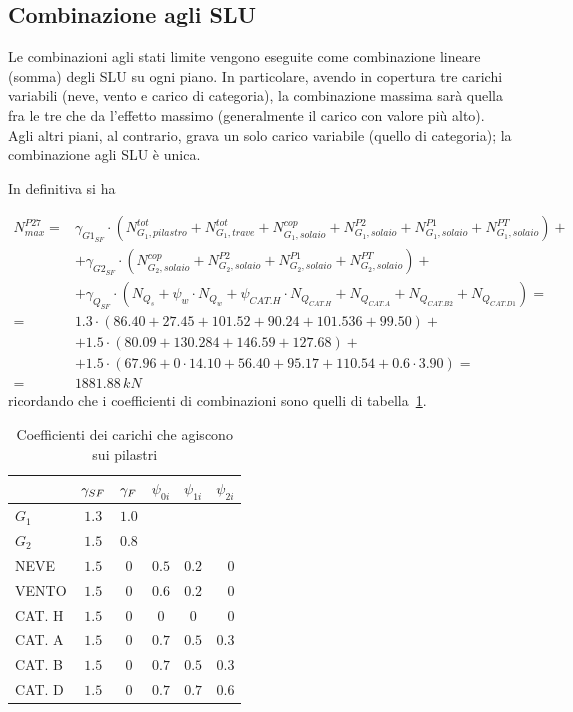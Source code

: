 \subsection{Combinazione agli SLU}
Le combinazioni agli stati limite vengono eseguite come combinazione lineare (somma) degli SLU su ogni piano. In particolare, avendo in copertura tre carichi variabili (neve, vento e carico di categoria), la combinazione massima sarà quella fra le tre che da l'effetto massimo (generalmente il carico con valore più alto). Agli altri piani, al contrario, grava un solo carico variabile (quello di categoria); la combinazione agli SLU è unica.

In definitiva si ha

\begin{align*}
	N_{max}^{P27} =& \gamma_{G1_{SF}} \cdot (N_{G_1,pilastro}^{tot} + N_{G_1, trave}^{tot} + N_{G_1, solaio}^{cop} + N_{G_1, solaio}^{P2}+ N_{G_1, solaio}^{P1} + N_{G_1, solaio}^{PT}) +\\ &+\gamma_{G2_{SF}} \cdot (N_{G_2, solaio}^{cop} + N_{G_2, solaio}^{P2}+ N_{G_2, solaio}^{P1} + N_{G_2, solaio}^{PT}) +\\
	&+\gamma_{Q_{SF}}\cdot (N_{Q_s} + \psi_{w}\cdot N_{Q_w} + \psi_{CAT.H}\cdot N_{Q_{CAT.H}} + N_{Q_{CAT.A}} + N_{Q_{CAT.B2}} + N_{Q_{CAT.D1}}) =\\
	=& 1.3\cdot(86.40+27.45+101.52+90.24+101.536+99.50)+\\
	&+1.5\cdot(80.09+130.284+146.59+127.68)+\\
	&+1.5\cdot(67.96+0\cdot14.10+56.40+95.17+110.54+0.6\cdot3.90) =\\
	=& 1881.88\,kN
\end{align*}
\noindent
ricordando che i coefficienti di combinazioni sono quelli di tabella~\ref{tab:coeffPilastro}.

\begin{table}
	\centering
	\caption{Coefficienti dei carichi che agiscono sui pilastri}
	\label{tab:coeffPilastro}
	\begin{tabular}{lccccr}
		\toprule
		&$\gamma_{\MakeUppercase{sf}}$ & $\gamma_{\MakeUppercase{f}}$ &$\psi_{0i}$ &$\psi_{1i}$ &$\psi_{2i}$\\
		\midrule
		$G_1$ & $1.3$ &$1.0$\\
		$G_2$ &$1.5$ &$0.8$\\
		NEVE &$1.5$ &$0$ &$0.5$ &$0.2$ &$0$\\
		VENTO &$1.5$ &$0$ &$0.6$ & $0.2$&$0$\\
		CAT. H &$1.5$&$0$&$0$&$0$&$0$\\
		CAT. A &$1.5$&$0$&$0.7$&$0.5$&$0.3$\\
		CAT. B &$1.5$ &$0$ &$0.7$ &$0.5$ &$0.3$\\
		CAT. D &$1.5$ &$0$ &$0.7$ &$0.7$ &$0.6$\\
		\bottomrule
	\end{tabular}
\end{table}

